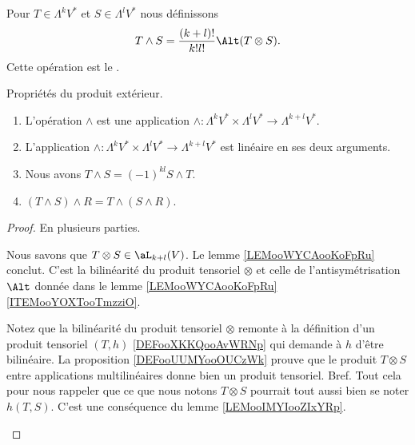 \begin{definition}
	Pour \( T\in \Lambda^kV^*\) et \( S\in\Lambda^lV^*\) nous définissons
	\begin{equation}
		T\wedge S=\frac{ (k+l)! }{ k!l! }\Alt(T\otimes S).
	\end{equation}
	Cette opération est le .
\end{definition}

\begin{lemma}		\label{LEMooKEOWooNDXqgr}
	Propriétés du produit extérieur.
	\begin{enumerate}
		\item		\label{ITEMooELVSooHlORJy}
		      L'opération \( \wedge\) est une application \(\wedge \colon \Lambda^kV^*\times\Lambda^lV^*\to \Lambda^{k+l}V^*  \).
		\item		\label{ITEMooRUBEooKVHFSz}
		      L'application \(\wedge \colon \Lambda^kV^*\times\Lambda^lV^*\to \Lambda^{k+l}V^*  \) est linéaire en ses deux arguments.
		\item		\label{ITEMooTCWPooIJYaRE}
		      Nous avons \( T\wedge S=(-1)^{kl}S\wedge T\).
		\item		\label{ITEMooKFPZooFenmCT}
		      \( (T\wedge S)\wedge R=T\wedge(S\wedge R)\).
	\end{enumerate}
\end{lemma}

\begin{proof}
	En plusieurs parties.
	\begin{subproof}
		Nous savons que \( T\otimes S\in\aL_{k+l}(V)\). Le lemme \ref{LEMooWYCAooKoFpRu} conclut.
		C'est la bilinéarité du produit tensoriel \( \otimes\) et celle de l'antisymétrisation \( \Alt\) donnée dans le lemme \ref{LEMooWYCAooKoFpRu}\ref{ITEMooYOXTooTmzziO}.

		Notez que la bilinéarité du produit tensoriel \( \otimes\) remonte à la définition d'un produit tensoriel \( (T,h)\) \ref{DEFooXKKQooAvWRNp} qui demande à \( h\) d'être bilinéaire. La proposition \ref{DEFooUUMYooOUCzWk} prouve que le produit \( T\otimes S\) entre applications multilinéaires donne bien un produit tensoriel. Bref. Tout cela pour nous rappeler que ce que nous notons \( T\otimes S\) pourrait tout aussi bien se noter \( h(T,S)\).
		C'est une conséquence du lemme \ref{LEMooIMYIooZIxYRp}.

	\end{subproof}
\end{proof}

